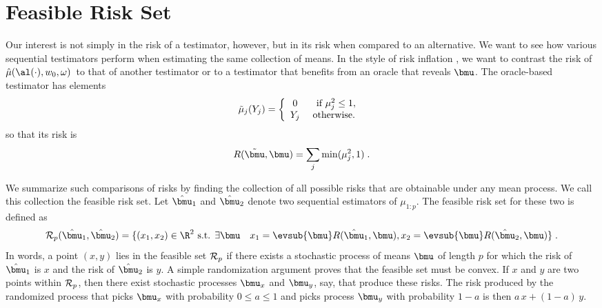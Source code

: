 \documentclass[12pt]{article}
\newcommand{\test}{\mbox{$\hat\mu(\al(\cdot),w_0,\omega)$}}
\begin{document}
\section{ Feasible Risk Set }


 Our interest is not simply in the risk of a testimator, however, but in its
 risk when compared to an alternative.  We want to see how various sequential
 testimators perform when estimating the same collection of means.  In the style
 of risk inflation , we want to contrast the risk of \test\ to that
 of another testimator or to a testimator that benefits from an oracle that
 reveals $\bmu$.  The oracle-based testimator has elements
 \begin{equation}
   \tilde\mu_j(Y_j) = \left\{ \begin{array}{cc} 
                       0    & \mbox{ if } \mu_j^2 \le 1,        \cr
                       Y_j  & \mbox{ otherwise. }
                \end{array} \right.
 \label{eq:muTilde}
 \end{equation}
 so that its risk is 
 \begin{equation}
    R(\tilde{\bmu},\bmu) = \sum_j \min(\mu_j^2,1) \;.   
 \label{eq:riskMuTilde}
 \end{equation}


 We summarize such comparisons of risks by finding the collection of all
 possible risks that are obtainable under any mean process.  We call this
 collection the feasible risk set.  Let $\hat{\bmu}_1$ and $\hat{\bmu}_2$ denote
 two sequential estimators of $\mu_{1:p}$.  The feasible risk set for these two
 is defined as
 \begin{equation}
     {\cal R}_p(\hat{\bmu}_1,\hat{\bmu}_2) = 
      \{(x_1,x_2) \in \R^2 \mbox{ s.t. } \exists \bmu  \quad
          x_1 = \evsub{\bmu} R(\hat{\bmu}_1,\bmu),
          x_2 = \evsub{\bmu} R(\hat{\bmu}_2,\bmu)  \} \;.           
 \label{eq:feasibleSet}
 \end{equation}
 In words, a point $(x,y)$ lies in the feasible set ${\cal R}_p$ if there exists
 a stochastic process of means $\bmu$ of length $p$ for which the risk of
 $\hat{\bmu}_1$ is $x$ and the risk of $\hat{\bmu}_2$ is $y$.  A simple
 randomization argument proves that the feasible set must be convex.  If $x$ and
 $y$ are two points within ${\cal R}_p$, then there exist stochastic processes
 $\bmu_x$ and $\bmu_y$, say, that produce these risks.  The risk produced by the
 randomized process that picks $\bmu_x$ with probability $0 \le a \le 1$ and
 picks process $\bmu_y$ with probability $1-a$ is then $a\,x+(1-a)\,y$.
\end{document}
